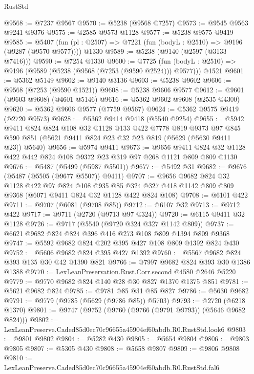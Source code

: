 \begin{lexlean}{RustStd}
\begin{coremodule}
@9568 := @7237 @9567
@9570 := @5238 (@9568 @7257)
@9573 := @9545 @9563 @9241 @9376
@9575 := @2585 @9573 @1128
@9577 := @5238 @9575 @9419
@9585 := @5407
    (fun (pl : @2507) => @7221 (fun (bodyL : @2510) => @9196 (@9287 (@9570 @9577))))
    @1330
@9589 := @5238 (@9140 (@2597 (@3133 @7416)))
@9590 := @7254 @1330
@9600 := @7725
    (fun (bodyL : @2510) => @9196 (@9589 (@5238 (@9568 (@7253 (@9590 @2524))) @9577)))
    @1521
@9601 := @5362 @5149
@9602 := @9140 @3136
@9603 := @5238 @9602
@9606 := @9568 (@7253 (@9590 @1521))
@9608 := @5238 @9606 @9577
@9612 := @9601 (@9603 @9608) (@4601 @5146)
@9616 := @5362 @9602 @9608 (@2535 @4300)
@9620 := @5362 @9606 @9577 (@7759 @9567)
@9624 := @5362 @9575 @9419 (@2720 @9573)
@9628 := @5362 @9414 @9418 (@5540 @9254)
@9655 := @5942
    @9411
    @824
    @824
    @108
    @32
    @1128
    @133
    @422
    @7778
    @819
    @9373
    @97
    @845
    @590
    @851
    (@5621 @9411 @824 @23 @32 @23 @819 (@5629 (@5630 @9411 @23)) @5640)
@9656 := @5974 @9411
@9673 := @9656
    @9411
    @824
    @32
    @1128
    @422
    @442
    @824
    @108
    @9372
    @23
    @319
    @97
    @268
    @1121
    @809
    @809
    @1130
@9676 := @5487 (@5499 (@5987 @5501))
@9677 := @5492 @31
@9682 := @9676 (@5487 (@5505 (@9677 @5507)) @9411)
@9707 := @9656
    @9682
    @824
    @32
    @1128
    @422
    @97
    @824
    @108
    @935
    @85
    @324
    @327
    @418
    @1142
    @809
    @809
    @9368
    (@6071 @9411 @824 @32 @1128 @422 @824 @108)
@9708 := @6101 @422
@9711 := @9707 (@6081 (@9708 @85))
@9712 := @6107 @32
@9713 := @9712 @422
@9717 := @9711 (@2720 (@9713 @97 @324))
@9720 := @6115 @9411 @32 @1128
@9726 := @9717 (@5540 (@9720 @324 @327 @1142 @809))
@9737 := @6621 @9682 @824 @824 @396 @416 @273 @108 @809 @1394 @809 @9368
@9747 := @5592 @9682 @824 @202 @395 @427 @108 @809 @1392 @824 @430
@9752 := @5606 @9682 @824 @395 @427 @1392
@9760 := @5567 @9682 @824 @393 @135 @30 @42 @1390 @821
@9766 := @7997 @9682 @824 @393 @30 @1386 @1388
@9770 := LexLeanPreservation.Rust.Corr.second @4580 @2646 @5220
@9779 := @9770 @9682 @824 @140 @28 @30 @827 @1370 @1375 @851
@9781 := @5621 @9682 @824
@9785 := @9781 @85 @31 @85 @827
@9786 := @5630 @9682
@9791 := @9779 (@9785 (@5629 (@9786 @85)) @5703)
@9793 := @2720 (@6218 @1370)
@9801 := @9747 (@9752 (@9760 (@9766 (@9791 @9793)) (@5646 @9682 @824)))
@9802 := LexLeanPreserve.Caded85d0ec70c96655a45904ef60abdb.R0.RustStd.look6
@9803 := @9801 @9802
@9804 := @5282 @430
@9805 := @5654 @9804
@9806 := @9803 @9805
@9807 := @5305 @430
@9808 := @5658 @9807
@9809 := @9806 @9808
@9810 := LexLeanPreserve.Caded85d0ec70c96655a45904ef60abdb.R0.RustStd.fal6

\end{coremodule}
\end{lexlean}
